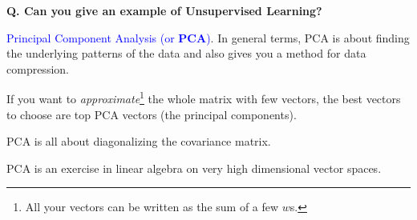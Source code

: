 \begin{frame}[fragile]{\textbf{Q. Can you give an example of Unsupervised Learning?}}
  \begin{wideitemize}
  \item \textcolor{blue}{Principal Component Analysis (or \textbf{PCA})}. In
    general terms, PCA is about finding the underlying patterns of the data and
    also gives you a method for data compression.\medskip
    \begin{wideitemize}
    \item If you want to \textit{approximate}\footnote{All your vectors can be
        written as the sum of a few $w$s.} the whole matrix with few vectors,
      the best vectors to choose are top PCA vectors (the principal components).
    \end{wideitemize}
  \item PCA is all about diagonalizing the covariance matrix.
    \begin{wideitemize}
    \item PCA is an exercise in linear algebra on very high dimensional vector spaces.
    \end{wideitemize}
  \end{wideitemize}
\end{frame}




